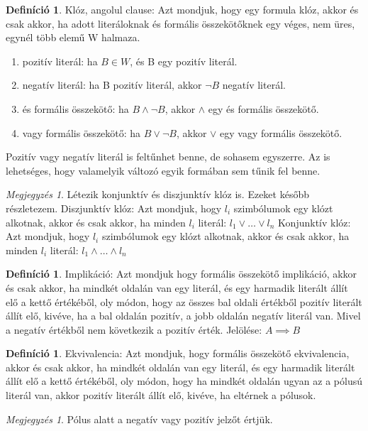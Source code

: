 \documentclass[
]{thesis-ekf}
\theoremstyle{definition}
\newtheorem{definicio}[tetel]{Definíció}
\theoremstyle{remark}
\newtheorem{megjegyzes}[tetel]{Megjegyzés}
\begin{document}
	\begin{definicio}
		Klóz, angolul clause: Azt mondjuk, hogy egy formula klóz, akkor és csak akkor, ha adott literáloknak és formális összekötőknek egy véges, nem üres, egynél több elemű W halmaza.
		\begin{enumerate}
			\item pozitív literál: ha $ B\in W $, és B egy pozitív literál.
			\item negatív literál: ha B pozitív literál, akkor $\neg B $ negatív literál.
			\item és formális összekötő: ha $ B \wedge \neg B $, akkor $\wedge$ egy és formális összekötő.
			\item vagy formális összekötő: ha $ B \vee \neg B $, akkor $\vee$ egy vagy formális összekötő.
		\end{enumerate}
		Pozitív vagy negatív literál is feltűnhet benne, de sohasem egyszerre. Az is lehetséges, hogy valamelyik változó egyik formában sem tűnik fel benne.
	\end{definicio}
	\begin{megjegyzes}
		Létezik konjunktív és diszjunktív klóz is. Ezeket később részletezem.
		Diszjunktív klóz: Azt mondjuk, hogy $ l_{i} $ szimbólumok egy klózt alkotnak, akkor és csak akkor, ha minden $ l_{i} $ literál: $ l_{1}\vee\dots\vee l_{n} $
		Konjunktív klóz: Azt mondjuk, hogy $ l_{i} $ szimbólumok egy klózt alkotnak, akkor és csak akkor, ha minden $ l_{i} $ literál: $ l_{1}\wedge\dots\wedge l_{n} $
	\end{megjegyzes}
	\begin{definicio}
		Implikáció: Azt mondjuk hogy formális összekötő implikáció, akkor és csak akkor, ha mindkét oldalán van egy literál, és egy harmadik literált állít elő a kettő értékéből, oly módon, hogy az összes bal oldali értékből pozitív literált állít elő, kivéve, ha a bal oldalán pozitív, a jobb oldalán negatív literál van.
		Mivel a negatív értékből nem következik a pozitív érték. Jelölése: $ A \implies B $
	\end{definicio}
	\begin{definicio}
		Ekvivalencia: Azt mondjuk, hogy formális összekötő ekvivalencia, akkor és csak akkor, ha mindkét oldalán van egy literál, és egy harmadik literált állít elő a kettő értékéből, oly módon, hogy ha mindkét oldalán ugyan az a pólusú literál van, akkor pozitív literált állít elő, kivéve, ha eltérnek a pólusok.
	\end{definicio}
	\begin{megjegyzes}
		Pólus alatt a negatív vagy pozitív jelzőt értjük.
	\end{megjegyzes}
\end{document}
